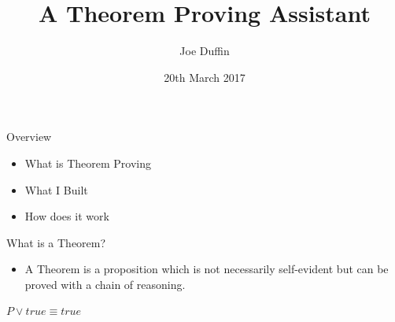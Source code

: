 \documentclass[11pt]{beamer}
\author{Joe Duffin}
\title{A Theorem Proving Assistant}
\institute{School of Computer Science \\University College Dublin}
\date{20th March 2017}
\begin{document}
\setlength{\abovedisplayskip}{0pt}
\setlength{\belowdisplayskip}{0pt}
\setlength{\abovedisplayshortskip}{0pt}
\setlength{\belowdisplayshortskip}{0pt}

\begin{frame}
\titlepage
\end{frame}


\begin{frame}{Overview}
\begin{itemize}
\setlength\itemsep{2em}
\item \Large{What is Theorem Proving}
\item \Large{What I Built}
\item \Large{How does it work}
\end{itemize}
\end{frame}

\begin{frame}{What is a Theorem?}
\begin{itemize}
\item \Large{A Theorem is a proposition which is not necessarily self-evident but can be proved with a chain of reasoning.}\\
\end{itemize}
\vspace{1cm}
\begin{Theorem}
\large{$P \vee true \equiv true$}
\end{Theorem}
\end{frame}
\end{document}
